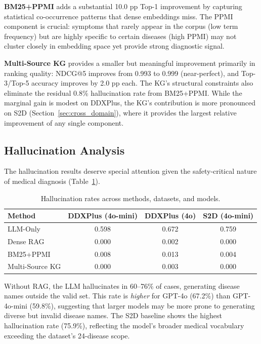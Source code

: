 \documentclass[review]{elsarticle}
\begin{document}
\textbf{BM25+PPMI} adds a substantial 10.0 pp Top-1 improvement by capturing statistical co-occurrence patterns that dense embeddings miss. The PPMI component is crucial: symptoms that rarely appear in the corpus (low term frequency) but are highly specific to certain diseases (high PPMI) may not cluster closely in embedding space yet provide strong diagnostic signal.

\textbf{Multi-Source KG} provides a smaller but meaningful improvement primarily in ranking quality: NDCG@5 improves from 0.993 to 0.999 (near-perfect), and Top-3/Top-5 accuracy improves by 2.0 pp each. The KG's structural constraints also eliminate the residual 0.8\% hallucination rate from BM25+PPMI. While the marginal gain is modest on DDXPlus, the KG's contribution is more pronounced on S2D (Section~\ref{sec:cross_domain}), where it provides the largest relative improvement of any single component.

\subsection{Hallucination Analysis}
\label{sec:hallucination}

The hallucination results deserve special attention given the safety-critical nature of medical diagnosis (Table~\ref{tab:halluc}).

\begin{table}[t]
\centering
\caption{Hallucination rates across methods, datasets, and models.}
\label{tab:halluc}
\begin{tabular}{lccc}
\toprule
\textbf{Method} & \textbf{DDXPlus (4o-mini)} & \textbf{DDXPlus (4o)} & \textbf{S2D (4o-mini)} \\
\midrule
LLM-Only        & 0.598 & 0.672 & 0.759 \\
Dense RAG        & 0.000 & 0.002 & 0.000 \\
BM25+PPMI        & 0.008 & 0.013 & 0.004 \\
Multi-Source KG  & 0.000 & 0.003 & 0.000 \\
\bottomrule
\end{tabular}
\end{table}

Without RAG, the LLM hallucinates in 60--76\% of cases, generating disease names outside the valid set. This rate is \emph{higher} for GPT-4o (67.2\%) than GPT-4o-mini (59.8\%), suggesting that larger models may be more prone to generating diverse but invalid disease names. The S2D baseline shows the highest hallucination rate (75.9\%), reflecting the model's broader medical vocabulary exceeding the dataset's 24-disease scope.
\end{document}
